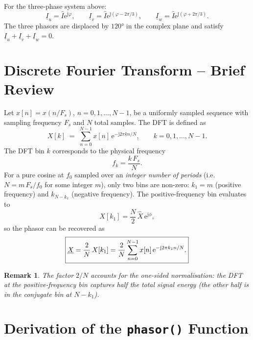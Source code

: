 \documentclass[11pt,a4paper]{article}
\newcommand{\jj}{\mathrm{j}}          %
\newcommand{\e}{\mathrm{e}}           %
\newtheorem{remark}{Remark}
\begin{document}
For the three-phase system above:
\begin{equation}
  \underline{I}_u = \hat{I}\e^{\jj\varphi},\qquad
  \underline{I}_v = \hat{I}\e^{\jj(\varphi - 2\pi/3)},\qquad
  \underline{I}_w = \hat{I}\e^{\jj(\varphi + 2\pi/3)}.
  \label{eq:phasors}
\end{equation}
The three phasors are displaced by $120°$ in the complex plane and satisfy
$\underline{I}_u + \underline{I}_v + \underline{I}_w = 0$.

\section{Discrete Fourier Transform – Brief Review}

Let $x[n] = x(n/F_s)$, $n = 0,1,\ldots,N-1$, be a uniformly sampled sequence
with sampling frequency $F_s$ and $N$ total samples.  The DFT is defined as
\begin{equation}
  X[k] \;=\; \sum_{n=0}^{N-1} x[n]\,\e^{-\jj 2\pi k n / N},
  \qquad k = 0, 1, \ldots, N-1.
  \label{eq:dft}
\end{equation}
The DFT bin $k$ corresponds to the physical frequency
\begin{equation}
  f_k = \frac{k\,F_s}{N}.
  \label{eq:fk}
\end{equation}
For a pure cosine at $f_0$ sampled over an \emph{integer number of periods}
(i.e.\ $N = m\,F_s/f_0$ for some integer $m$), only two bins are non-zero:
$k_1 = m$ (positive frequency) and $k_{N-k_1}$ (negative frequency).  The
positive-frequency bin evaluates to
\begin{equation}
  X[k_1] = \frac{N}{2}\,\hat{X}\,\e^{\jj\phi},
  \label{eq:dft_cosine}
\end{equation}
so the phasor can be recovered as
\begin{equation}
  \boxed{%
  \underline{X} = \frac{2}{N}\,X[k_1]
               = \frac{2}{N}\sum_{n=0}^{N-1} x[n]\,\e^{-\jj 2\pi k_1 n/N}.}
  \label{eq:phasor_extract}
\end{equation}

\begin{remark}
  The factor $2/N$ accounts for the one-sided normalisation: the DFT at the
  positive-frequency bin captures half the total signal energy (the other half
  is in the conjugate bin at $N-k_1$).
\end{remark}

\section{Derivation of the \texttt{phasor()} Function}
\label{sec:derivation}
\end{document}
